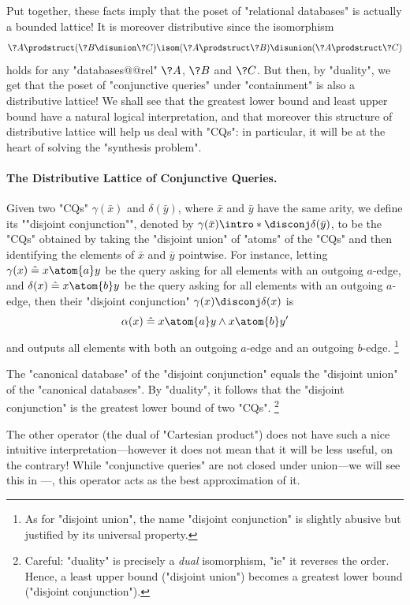 Put together, these facts imply that the poset of "relational databases" is
actually a bounded lattice! It is moreover distributive
since the isomorphism
\[
	\?A \prodstruct (\?B \disunion \?C) \isom (\?A \prodstruct \?B) \disunion (\?A \prodstruct \?C)
\]
holds for any "databases@@rel" $\?A$, $\?B$ and $\?C$.
But then, by "duality", we get that the poset of "conjunctive queries"
under "containment" is also a distributive lattice!
We shall see that the greatest lower bound and least upper bound
have a natural logical interpretation, and that moreover
this structure of distributive lattice will help us
deal with "CQs": in particular, it will be at the heart of
solving the "synthesis problem". 


\paragraph*{The Distributive Lattice of Conjunctive Queries.}

Given two "CQs" $\gamma(\bar x)$ and $\delta(\bar y)$,
where $\bar x$ and $\bar y$ have the same arity, we define
its \AP""disjoint conjunction"", denoted by
$\gamma(\bar x) \intro*\disconj \delta(\bar y)$,
to be the "CQs" obtained by taking the "disjoint union" of "atoms" 
of the "CQs" and then identifying the elements of $\bar x$ and $\bar y$ pointwise.
For instance, letting $\gamma(x) \defeq x \atom{a} y$ be the query
asking for all elements with an outgoing $a$-edge,
and $\delta(x) \defeq x \atom{b} y$ be the query
asking for all elements with an outgoing $a$-edge,
then their "disjoint conjunction" $\gamma(x) \disconj \delta(x)$ is
\[
	\alpha(x) \defeq x \atom{a} y \land x \atom{b} y'
\]
and outputs all elements with both an outgoing $a$-edge and an outgoing $b$-edge.%
\footnote{As for "disjoint union", the name "disjoint conjunction" is slightly abusive
but justified by its universal property.}

\begin{fact}
	The "canonical database" of the "disjoint conjunction"
	equals the "disjoint union" of the "canonical databases".
	By "duality", it follows that
	the "disjoint conjunction" is the greatest lower bound
	of two "CQs".%
	\footnote{Careful: "duality" is precisely a \emph{dual} isomorphism,
	"ie" it reverses the order. Hence, a least upper bound ("disjoint union")
	becomes a greatest lower bound ("disjoint conjunction").}
\end{fact}

The other operator (the dual of "Cartesian product")
does not have such a nice intuitive interpretation---however
it does not mean that it will be less useful, on the contrary!
While "conjunctive queries" are not closed under
union---we will see this in ---, this operator
acts as the best approximation of it.

